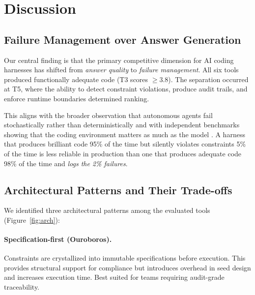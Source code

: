 \documentclass[11pt,a4paper]{article}
\begin{document}
\section{Discussion}
\label{sec:discussion}

\subsection{Failure Management over Answer Generation}

Our central finding is that the primary competitive dimension for AI coding harnesses has shifted from \emph{answer quality} to \emph{failure management}.
All six tools produced functionally adequate code (T3 scores $\geq 3.8$).
The separation occurred at T5, where the ability to detect constraint violations, produce audit trails, and enforce runtime boundaries determined ranking.

This aligns with the broader observation that autonomous agents fail stochastically rather than deterministically \cite{guardrailsmd2026} and with independent benchmarks showing that the coding environment matters as much as the model \cite{render2025benchmark}.
A harness that produces brilliant code 95\% of the time but silently violates constraints 5\% of the time is less reliable in production than one that produces adequate code 98\% of the time and \emph{logs the 2\% failures}.

\subsection{Architectural Patterns and Their Trade-offs}

We identified three architectural patterns among the evaluated tools (Figure~\ref{fig:arch}):

\paragraph{Specification-first (Ouroboros).}
Constraints are crystallized into immutable specifications before execution.
This provides structural support for compliance but introduces overhead in seed design and increases execution time.
Best suited for teams requiring audit-grade traceability.
\end{document}
